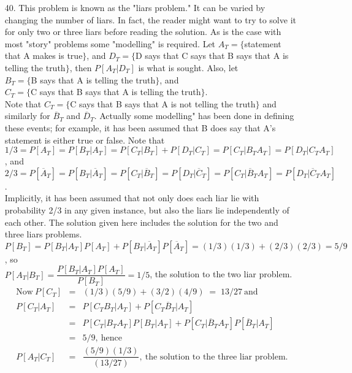 \begin{enumerate}
	\item[40.] This problem is known as the "liars problem." It can be varied by changing the number of liars.  In fact, the reader might want to try to solve it for only two or three liars before reading the solution.  As is the case with most "story" problems some "modelling" is required.  Let $A_T = \{$statement that A makes is true$\}$, and $D_T = \{$D says that C says that B says that A is telling the truth$\}$, then $P[A_T\vert D_T]$ is what is sought.  Also, let \\
	$B_T = \{$B says that A is telling the truth$\}$, and \\ 
	$C_T = \{$C says that B says that A is telling the truth$\}$. \\
	Note that $C_T = \{$C says that B says that A is not telling the truth$\}$ and similarly for $\overline{B}_T$ and $\overline{D}_T$.  Actually some modelling" has been done in defining these events; for example, it has been assumed that B does say that A's statement is either true or false.  Note that \\
	$1/3 = P[A_T] = P[B_T\vert A_T] = P[C_T\vert B_T] +P[D_T\vert C_T] = P[C_T\vert B_TA_T] = P[D_T\vert C_TA_T]$, and \\
	$2/3 = P[\overline{A}_T] = P[B_T\vert \overline{A}_T] = P[C_T\vert \overline{B}_T] = P[D_T\vert \overline{C}_T] = P[C_T\vert \overline{B}_TA_T] = P[D_T\vert \overline{C}_TA_T]$. \\
	Implicitly, it has been assumed that not only does each liar lie with probability 2/3 in any given instance, but also the liars lie independently of each other.  The solution given here includes the solution for the two and three liars problems. \\
	$P[B_T] = P[B_T\vert A_T]P[A_T] + P[B_T\vert \overline{A}_T]P[\overline{A}_T] = (1/3)(1/3) + (2/3)(2/3) = 5/9$, so \\
	$P[A_T\vert B_T] = \dfrac{P[B_T\vert A_T]P[A_T]}{P[B_T]} = 1/5$, the solution to the two liar problem.
	\begin{eqnarray*}
	\text{Now}\ P[C_T] &=& (1/3)(5/9) + (3/2)(4/9) \;=\; 13/27\ \text{and} \\
	    P[C_T\vert A_T] &=& P[C_TB_T\vert A_T] + P[C_T\overline{B}_T\vert A_T] \\
	    	&=& P[C_T\vert B_TA_T]P[B_T\vert A_T] + P[C_T\vert \overline{B}_TA_T]P[\overline{B}_T\vert A_T] \\
	    	&=& 5/9,\ \text{hence} \\
	    P[A_T\vert C_T] &=& \dfrac{(5/9)(1/3)}{(13/27)},\ \text{the solution to the three liar problem.}	

\end{eqnarray*}
\end{enumerate}
